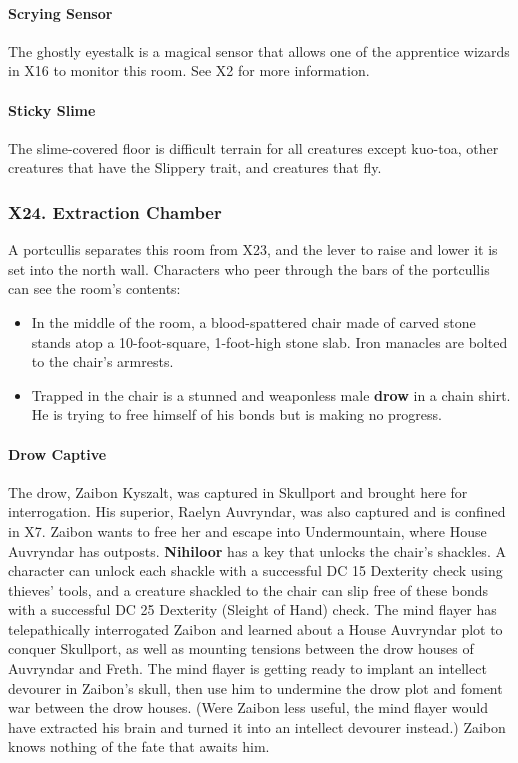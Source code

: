 \documentclass[10pt,a4paper,twoside,twocolumn,openany,nodeprecatedcode]{dndbook}
\begin{document}
\paragraph{Scrying Sensor}
The ghostly eyestalk is a magical sensor that allows one of the apprentice wizards in X16 to monitor this room. See X2 for more information.
\paragraph{Sticky Slime}
The slime-covered floor is difficult terrain for all creatures except kuo-toa, other creatures that have the Slippery trait, and creatures that fly.
\subsubsection{X24. Extraction Chamber}
A portcullis separates this room from X23, and the lever to raise and lower it is set into the north wall. Characters who peer through the bars of the portcullis can see the room's contents:
\begin{itemize}

\item In the middle of the room, a blood-spattered chair made of carved stone stands atop a 10-foot-square, 1-foot-high stone slab. Iron manacles are bolted to the chair's armrests.
\item Trapped in the chair is a stunned and weaponless male \textbf{drow} in a chain shirt. He is trying to free himself of his bonds but is making no progress.
\end{itemize}


\paragraph{Drow Captive}
The drow, Zaibon Kyszalt, was captured in Skullport and brought here for interrogation. His superior, Raelyn Auvryndar, was also captured and is confined in X7. Zaibon wants to free her and escape into Undermountain, where House Auvryndar has outposts.
\textbf{Nihiloor} has a key that unlocks the chair's shackles. A character can unlock each shackle with a successful DC 15 Dexterity check using thieves' tools, and a creature shackled to the chair can slip free of these bonds with a successful DC 25 Dexterity (Sleight of Hand) check.
The mind flayer has telepathically interrogated Zaibon and learned about a House Auvryndar plot to conquer Skullport, as well as mounting tensions between the drow houses of Auvryndar and Freth. The mind flayer is getting ready to implant an intellect devourer in Zaibon's skull, then use him to undermine the drow plot and foment war between the drow houses. (Were Zaibon less useful, the mind flayer would have extracted his brain and turned it into an intellect devourer instead.) Zaibon knows nothing of the fate that awaits him.
\end{document}
